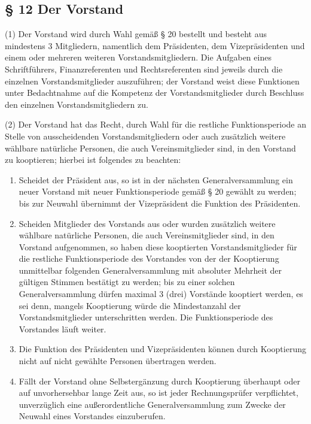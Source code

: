 \documentclass[10pt,a4paper]{article}
\begin{document}
\subsection{§ 12
Der Vorstand}

(1)
Der Vorstand wird durch Wahl gemäß § 20 bestellt und besteht aus mindestens 3 Mitgliedern, namentlich dem Präsidenten, dem Vizepräsidenten und einem oder mehreren weiteren Vorstandsmitgliedern.
Die Aufgaben eines Schriftführers, Finanzreferenten und Rechtsreferenten sind jeweils durch die einzelnen Vorstandsmitglieder auszuführen; der Vorstand weist diese Funktionen unter Bedachtnahme auf die Kompetenz der Vorstandsmitglieder durch Beschluss den einzelnen Vorstandsmitgliedern zu.

(2)
Der Vorstand hat das Recht, durch Wahl für die restliche Funktionsperiode an Stelle von ausscheidenden Vorstandsmitgliedern oder auch zusätzlich weitere wählbare natürliche Personen, die auch Vereinsmitglieder sind, in den Vorstand zu kooptieren; hierbei ist folgendes zu beachten:

\begin{enumerate}[label=\alph*)]
\item
Scheidet der Präsident aus, so ist in der nächsten Generalversammlung ein neuer Vorstand mit neuer Funktionsperiode gemäß § 20 gewählt zu werden;
bis zur Neuwahl übernimmt der Vizepräsident die Funktion des Präsidenten.
\item
Scheiden Mitglieder des Vorstands aus oder wurden zusätzlich weitere wählbare natürliche Personen, die auch Vereinsmitglieder sind, in den Vorstand aufgenommen, so haben diese kooptierten Vorstandsmitglieder für die restliche Funktionsperiode des Vorstandes von der der Kooptierung unmittelbar folgenden Generalversammlung mit absoluter Mehrheit der gültigen Stimmen bestätigt zu werden; bis zu einer solchen Generalversammlung dürfen maximal 3 (drei) Vorstände kooptiert werden, es sei denn, mangels Kooptierung würde die Mindestanzahl der Vorstandsmitglieder unterschritten werden.
Die Funktionsperiode des Vorstandes läuft weiter.
\item
Die Funktion des Präsidenten und Vizepräsidenten können durch Kooptierung nicht auf nicht gewählte Personen übertragen werden.
\item
Fällt der Vorstand ohne Selbstergänzung durch Kooptierung überhaupt oder auf unvorhersehbar lange Zeit aus, so ist jeder Rechnungsprüfer verpflichtet, unverzüglich eine außerordentliche Generalversammlung zum Zwecke der Neuwahl eines Vorstandes einzuberufen.
\end{enumerate}
\end{document}
